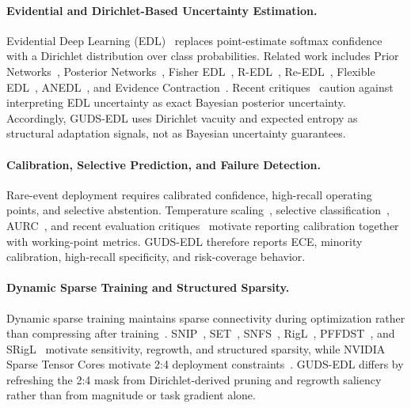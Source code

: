 \documentclass[letterpaper]{article} %
\begin{document}
\paragraph{Evidential and Dirichlet-Based Uncertainty Estimation.} Evidential Deep Learning (EDL)~\cite{sensoy2018evidential} replaces point-estimate softmax confidence with a Dirichlet distribution over class probabilities. Related work includes Prior Networks~\cite{malinin2018predictive}, Posterior Networks~\cite{charpentier2020posterior}, Fisher EDL~\cite{deng2023fisher}, R-EDL~\cite{chen2023redl}, Re-EDL~\cite{chen2024reedl}, Flexible EDL~\cite{yoon2025flexible}, ANEDL~\cite{yu2024anedl}, and Evidence Contraction~\cite{wu2024evidence}. Recent critiques~\cite{shen2024mirage} caution against interpreting EDL uncertainty as exact Bayesian posterior uncertainty. Accordingly, GUDS-EDL uses Dirichlet vacuity and expected entropy as structural adaptation signals, not as Bayesian uncertainty guarantees.

\paragraph{Calibration, Selective Prediction, and Failure Detection.} Rare-event deployment requires calibrated confidence, high-recall operating points, and selective abstention. Temperature scaling~\cite{guo2017calibration}, selective classification~\cite{geifman2017selective,geifman2019selectivenet}, AURC~\cite{ding2020revisiting}, and recent evaluation critiques~\cite{jaeger2023call,traub2024overcoming} motivate reporting calibration together with working-point metrics. GUDS-EDL therefore reports ECE, minority calibration, high-recall specificity, and risk-coverage behavior.

\paragraph{Dynamic Sparse Training and Structured Sparsity.} Dynamic sparse training maintains sparse connectivity during optimization rather than compressing after training~\cite{han2016deep,frankle2019lottery}. SNIP~\cite{lee2019snip}, SET~\cite{mocanu2018scalable}, SNFS~\cite{dettmers2019sparse}, RigL~\cite{evci2020rigging}, PFFDST~\cite{li2025pffdst}, and SRigL~\cite{lasby2023srigl} motivate sensitivity, regrowth, and structured sparsity, while NVIDIA Sparse Tensor Cores motivate 2:4 deployment constraints~\cite{mishra2021accelerating}. GUDS-EDL differs by refreshing the 2:4 mask from Dirichlet-derived pruning and regrowth saliency rather than from magnitude or task gradient alone.
\end{document}
